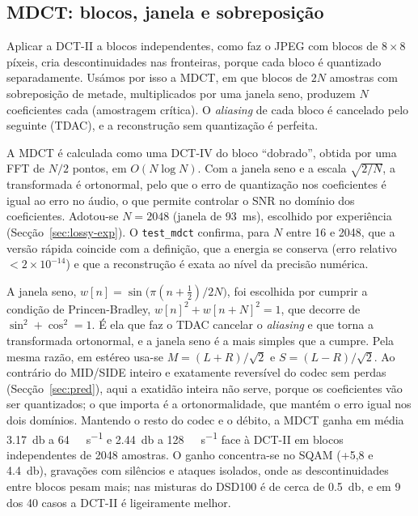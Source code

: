 \documentclass[a4paper,11pt]{article}
\newcommand{\prog}[1]{\texttt{#1}}
\begin{document}
\subsection{MDCT: blocos, janela e sobreposição}
\label{sec:mdct}
Aplicar a DCT-II a blocos independentes, como faz o JPEG com blocos de
$8 \times 8$ píxeis, cria descontinuidades nas fronteiras, porque cada bloco é
quantizado separadamente. Usámos por isso a MDCT, em que blocos de
$2N$ amostras com sobreposição de metade, multiplicados por uma janela seno,
produzem $N$ coeficientes cada (amostragem crítica). O \emph{aliasing}
de cada bloco é cancelado pelo seguinte (TDAC), e a reconstrução sem
quantização é perfeita.

A MDCT é calculada como uma DCT-IV do bloco ``dobrado'', obtida por uma FFT de
$N/2$ pontos, em $O(N\log N)$. Com a janela seno e a escala $\sqrt{2/N}$, a
transformada é ortonormal, pelo que o erro de quantização nos coeficientes é igual ao
erro no áudio, o que permite controlar o SNR no domínio dos coeficientes.
Adotou-se $N = 2048$ (janela de \SI{93}{\milli\second}), escolhido por
experiência (Secção~\ref{sec:lossy-exp}). O \prog{test\_mdct} confirma, para $N$
entre 16 e 2048, que a versão rápida coincide com a definição, que a energia se
conserva (erro relativo $< 2\times10^{-14}$) e que a reconstrução é exata ao
nível da precisão numérica.

A janela seno, $w[n] = \sin\!\big(\pi(n+\tfrac12)/2N\big)$, foi escolhida por
cumprir a condição de Princen-Bradley, $w[n]^2 + w[n+N]^2 = 1$, que decorre de
$\sin^2 + \cos^2 = 1$. É ela que faz o TDAC cancelar o \emph{aliasing} e que torna
a transformada ortonormal, e a janela seno é a mais simples que a cumpre. Pela
mesma razão, em estéreo usa-se $M = (L+R)/\sqrt2$ e $S = (L-R)/\sqrt2$. Ao
contrário do MID/SIDE inteiro e exatamente reversível do codec sem perdas
(Secção~\ref{sec:pred}), aqui a exatidão inteira não serve, porque os
coeficientes vão ser quantizados; o que importa é a ortonormalidade, que mantém
o erro igual nos dois domínios. Mantendo o resto do codec e o débito, a MDCT
ganha em média \SI{3,17}{\decibel} a \SI{64}{\kilo\bit\per\second} e
\SI{2,44}{\decibel} a \SI{128}{\kilo\bit\per\second} face à DCT-II em blocos
independentes de 2048 amostras. O ganho concentra-se no SQAM (+5,8 e
\SI{+4,4}{\decibel}), gravações com silêncios e ataques isolados, onde as
descontinuidades entre blocos pesam mais; nas misturas do DSD100 é de cerca de
\SI{0,5}{\decibel}, e em 9 dos 40 casos a DCT-II é ligeiramente melhor.
\end{document}
